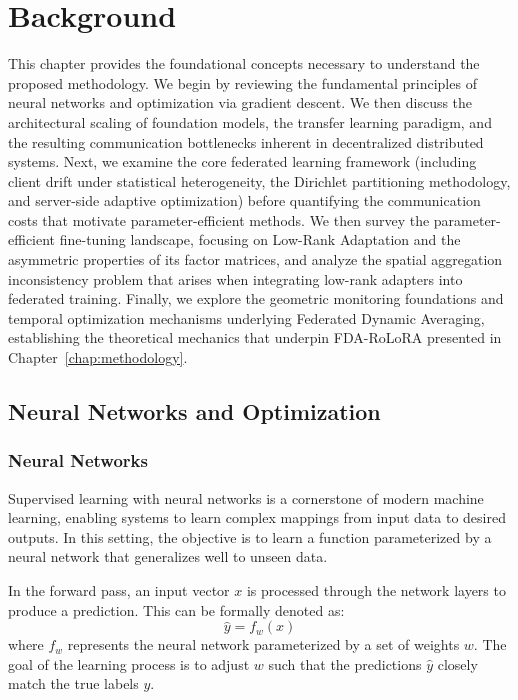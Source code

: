 \chapter{Background}
\label{chap:background}

This chapter provides the foundational concepts necessary to understand the proposed methodology. We begin by reviewing the fundamental principles of neural networks and optimization via gradient descent. We then discuss the architectural scaling of foundation models, the transfer learning paradigm, and the resulting communication bottlenecks inherent in decentralized distributed systems. Next, we examine the core federated learning framework (including client drift under statistical heterogeneity, the Dirichlet partitioning methodology, and server-side adaptive optimization) before quantifying the communication costs that motivate parameter-efficient methods. We then survey the parameter-efficient fine-tuning landscape, focusing on Low-Rank Adaptation and the asymmetric properties of its factor matrices, and analyze the spatial aggregation inconsistency problem that arises when integrating low-rank adapters into federated training. Finally, we explore the geometric monitoring foundations and temporal optimization mechanisms underlying Federated Dynamic Averaging, establishing the theoretical mechanics that underpin FDA-RoLoRA presented in Chapter~\ref{chap:methodology}.

\section{Neural Networks and Optimization}
\label{sec:nn_sgd}

\subsection{Neural Networks}
Supervised learning with neural networks is a cornerstone of modern machine learning, enabling systems to learn complex mappings from input data to desired outputs. In this setting, the objective is to learn a function parameterized by a neural network that generalizes well to unseen data.

In the forward pass, an input vector $x$ is processed through the network layers to produce a prediction. This can be formally denoted as:
\begin{equation}
    \hat{y} = f_w(x)
    \label{eq:forward_pass}
\end{equation}
where $f_w$ represents the neural network parameterized by a set of weights $w$. The goal of the learning process is to adjust $w$ such that the predictions $\hat{y}$ closely match the true labels $y$.

